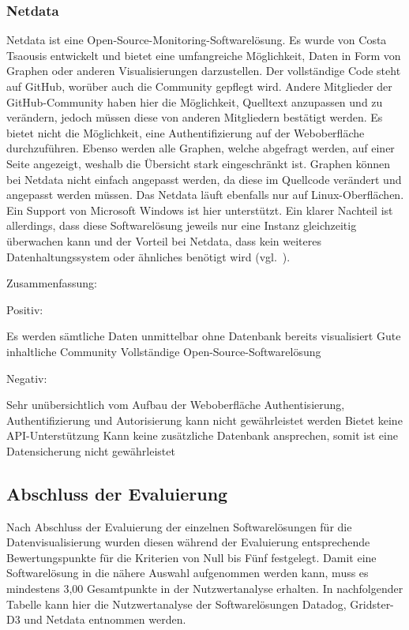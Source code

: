 \subsubsection{Netdata}
\label{subsubsec:netdata}
Netdata ist eine Open\hyp{}Source\hyp{}Monitoring\hyp{}Softwarelösung. Es wurde
von Costa Tsaousis entwickelt und bietet eine umfangreiche Möglichkeit, Daten
in Form von Graphen oder anderen Visualisierungen darzustellen. Der
vollständige Code steht auf GitHub, worüber auch die Community gepflegt wird.
Andere Mitglieder der GitHub\hyp{}Community haben hier die Möglichkeit,
Quelltext anzupassen und zu verändern, jedoch müssen diese von anderen
Mitgliedern bestätigt werden. Es bietet nicht die Möglichkeit, eine
Authentifizierung auf der Weboberfläche durchzuführen. Ebenso werden alle
Graphen, welche abgefragt werden, auf einer Seite angezeigt, weshalb die
Übersicht stark eingeschränkt ist. Graphen können bei Netdata nicht einfach
angepasst werden, da diese im Quellcode verändert und angepasst werden müssen.
Das Netdata läuft ebenfalls nur auf Linux\hyp{}Oberflächen.  Ein Support von
Microsoft Windows ist hier unterstützt. Ein klarer Nachteil ist allerdings,
dass diese Softwarelösung jeweils nur eine Instanz gleichzeitig überwachen kann
und der Vorteil bei Netdata, dass kein weiteres Datenhaltungssystem oder
ähnliches benötigt wird (vgl.~\cite{netdata}).

Zusammenfassung:

Positiv:

\begin{outline}
  \1 Es werden sämtliche Daten unmittelbar ohne Datenbank bereits visualisiert
  \1 Gute inhaltliche Community
  \1 Vollständige Open\hyp{}Source\hyp{}Softwarelösung
\end{outline}

Negativ:

\begin{outline}
  \1 Sehr unübersichtlich vom Aufbau der Weboberfläche
  \1 Authentisierung, Authentifizierung und Autorisierung kann nicht
  gewährleistet werden
  \1 Bietet keine API\hyp{}Unterstützung
  \1 Kann keine zusätzliche Datenbank ansprechen, somit ist eine Datensicherung
  nicht gewährleistet
\end{outline}
\mr%

\subsection{Abschluss der Evaluierung}
\label{subsec:abschluss_evaluierung}
Nach Abschluss der Evaluierung der einzelnen Softwarelösungen für die
Datenvisualisierung wurden diesen während der Evaluierung entsprechende
Bewertungspunkte für die Kriterien von Null bis Fünf festgelegt. Damit eine
Softwarelösung in die nähere Auswahl aufgenommen werden kann, muss es
mindestens 3,00 Gesamtpunkte in der Nutzwertanalyse erhalten. In
nachfolgender Tabelle kann hier die Nutzwertanalyse der Softwarelösungen
Datadog, Gridster\hyp{}D3 und Netdata entnommen werden.

